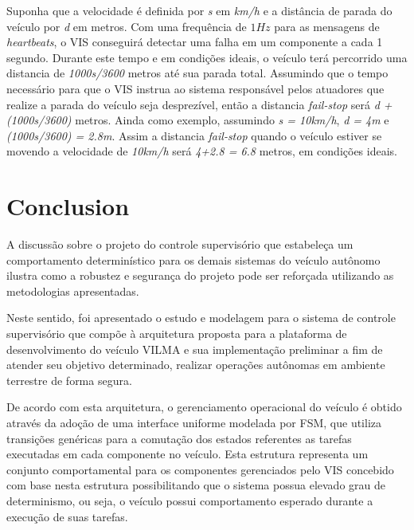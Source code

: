 \documentclass[conference]{IEEEtran}
\begin{document}
Suponha que a velocidade é definida por \textit{s} em \textit{km/h} e a distância de parada do veículo por \textit{d} em metros. Com uma frequência de $1Hz$ para as mensagens de \textit{heartbeats}, o VIS conseguirá detectar uma falha em um componente a cada 1 segundo. Durante este tempo e em condições ideais, o veículo terá percorrido uma distancia de \textit{1000s/3600} metros até sua parada total. Assumindo que o tempo necessário para que o VIS instrua ao sistema responsável pelos atuadores que realize a parada do veículo seja desprezível, então a distancia \textit{fail-stop} será \textit{d + (1000s/3600)} metros. Ainda como exemplo, assumindo \textit{s = 10km/h}, \textit{d = 4m} e \textit{(1000s/3600) = 2.8m}. Assim a distancia \textit{fail-stop} quando o veículo estiver se movendo a velocidade de \textit{10km/h} será \textit{4+2.8 = 6.8} metros, em condições ideais.

\section{Conclusion}\label{sec:conclusion}



A discussão sobre o projeto do controle supervisório que estabeleça um comportamento determinístico para os demais sistemas do veículo autônomo ilustra como a robustez e segurança do projeto pode ser reforçada utilizando as metodologias apresentadas.

Neste sentido, foi apresentado o estudo e modelagem para o sistema de controle supervisório que compõe à arquitetura proposta para a plataforma de desenvolvimento do veículo VILMA e sua implementação preliminar a fim de atender seu objetivo determinado, realizar operações autônomas em ambiente terrestre de forma segura.

De acordo com esta arquitetura, o gerenciamento operacional do veículo é obtido através da adoção de uma interface uniforme modelada por FSM, que utiliza transições genéricas para a comutação dos estados referentes as tarefas executadas em cada componente no veículo. Esta estrutura representa um conjunto comportamental para os componentes gerenciados pelo VIS concebido com base nesta estrutura possibilitando que o sistema possua elevado grau de determinismo, ou seja, o veículo possui comportamento esperado durante a execução de suas tarefas.
\end{document}
